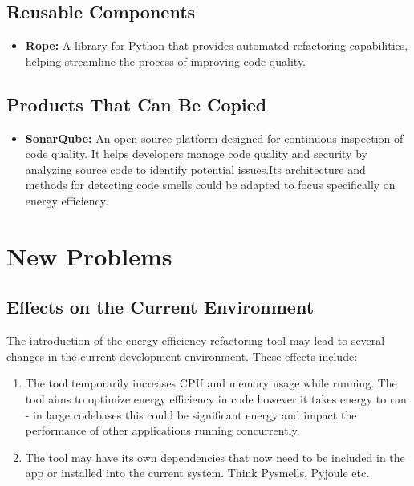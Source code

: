 \documentclass[12pt]{article}
\begin{document}
\subsection{Reusable Components}
\begin{itemize}
  \item \textbf{Rope:} A library for Python that provides automated refactoring capabilities, helping streamline the process of improving code quality.
\end{itemize}
\subsection{Products That Can Be Copied}
\begin{itemize}
  \item \textbf{SonarQube:} An open-source platform designed for continuous inspection of code quality. It helps developers manage code quality and security by analyzing source code to identify potential issues.Its architecture and methods for detecting code smells could be adapted to focus specifically on energy efficiency. 
\end{itemize}

\section{New Problems}
\subsection{Effects on the Current Environment}
The introduction of the energy efficiency refactoring tool may lead to several changes in the current development environment. These effects include:
\begin{enumerate}
  \item The tool temporarily increases CPU and memory usage while running. The tool aims to optimize energy efficiency in code however it takes energy to run - in large codebases this could be significant energy and impact the performance of other applications running concurrently. 
  \item The tool may have its own dependencies that now need to be included in the app or installed into the current system. Think Pysmells, Pyjoule etc.
\end{enumerate}
\end{document}
